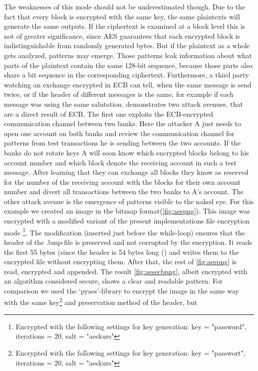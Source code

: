 The weaknesses of this mode
should not be underestimated though. Due to the fact that every block is
encrypted with the same key, the same plaintexts will generate the same
outputs. If the ciphertext is examined at a block level this is not of
greater significance, since AES guarantees that each encrypted block is
indistinguishable from randomly generated bytes. But if the plaintext as
a whole gets analyzed, patterns may emerge. Those patterns leak
information about what parts of the plaintext contain the same 128-bit
sequence, because those parts also share a bit sequence in
the corresponding ciphertext. Furthermore, a third party watching an
exchange encrypted in \ac{ECB} can tell, when the same
message is send twice, or if the header of different messages is the
same, for example if each message was using the same salutation. \cite{paar}
demonstrates two attack avenues, that are a direct result of \ac{ECB}. The
first one exploits the \ac{ECB}-encrypted communication channel between two
banks. Here the attacker A just needs to open one account on both banks
and review the communication channel for patterns from test transactions
he is sending between the two accounts. If the banks do not rotate keys
A will soon know which encrypted blocks belong to his account number and
which block denote the receiving account in such a test message. After learning that they can
exchange all blocks they know as reserved for the number of the
receiving account with the blocks for their own account number and
divert all transactions between the two banks to A's account. The other
attack avenue is the emergence of patterns visible to the naked eye. For
this example we created an image in the bitmap format(\ref{fig:aespng}). This
image was encrypted with a modified variant of the present
implementations file encryption mode \footnote{Encrypted with the following settings for key generation: key = "password", iterations = 20, salt = "aeskurs"}. The modification (inserted just
before the while-loop) ensures that the header of the .bmp-file is
preserved and not corrupted by the encryption. It reads the first 55
bytes (since the header is 54 bytes long
(\cite{bmpheader}) and writes them to the
encrypted file without encrypting them. After that, the rest of \ref{fig:aespng}
is read, encrypted and appended. The result \ref{fig:aesecbpng}, albeit encrypted
with an algorithm considered secure, shows a clear and readable pattern.
For comparison we used the `pyaes'-library to encrypt the image in the
same way with the same key\footnote{Encrypted with the following settings for key generation: key = "passwort", iterations = 20, salt = "aeskurs"} and preservation method of the header, but
